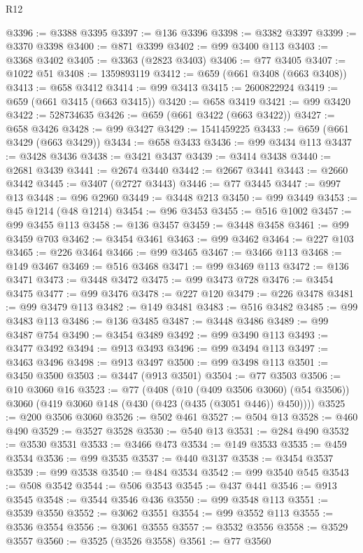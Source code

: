 \begin{lexlean}{R12}
\begin{coremodule}
@3396 := @3388 @3395
@3397 := @136 @3396
@3398 := @3382 @3397
@3399 := @3370 @3398
@3400 := @871 @3399
@3402 := @99 @3400 @113
@3403 := @3368 @3402
@3405 := @3363 (@2823 @3403)
@3406 := @77 @3405
@3407 := @1022 @51
@3408 := 1359893119
@3412 := @659 (@661 @3408 (@663 @3408))
@3413 := @658 @3412
@3414 := @99 @3413
@3415 := 2600822924
@3419 := @659 (@661 @3415 (@663 @3415))
@3420 := @658 @3419
@3421 := @99 @3420
@3422 := 528734635
@3426 := @659 (@661 @3422 (@663 @3422))
@3427 := @658 @3426
@3428 := @99 @3427
@3429 := 1541459225
@3433 := @659 (@661 @3429 (@663 @3429))
@3434 := @658 @3433
@3436 := @99 @3434 @113
@3437 := @3428 @3436
@3438 := @3421 @3437
@3439 := @3414 @3438
@3440 := @2681 @3439
@3441 := @2674 @3440
@3442 := @2667 @3441
@3443 := @2660 @3442
@3445 := @3407 (@2727 @3443)
@3446 := @77 @3445
@3447 := @997 @13
@3448 := @96 @2960
@3449 := @3448 @213
@3450 := @99 @3449
@3453 := @45 @1214 (@48 @1214)
@3454 := @96 @3453
@3455 := @516 @1002
@3457 := @99 @3455 @113
@3458 := @136 @3457
@3459 := @3448 @3458
@3461 := @99 @3459 @703
@3462 := @3454 @3461
@3463 := @99 @3462
@3464 := @227 @103
@3465 := @226 @3464
@3466 := @99 @3465
@3467 := @3466 @113
@3468 := @149 @3467
@3469 := @516 @3468
@3471 := @99 @3469 @113
@3472 := @136 @3471
@3473 := @3448 @3472
@3475 := @99 @3473 @728
@3476 := @3454 @3475
@3477 := @99 @3476
@3478 := @227 @120
@3479 := @226 @3478
@3481 := @99 @3479 @113
@3482 := @149 @3481
@3483 := @516 @3482
@3485 := @99 @3483 @113
@3486 := @136 @3485
@3487 := @3448 @3486
@3489 := @99 @3487 @754
@3490 := @3454 @3489
@3492 := @99 @3490 @113
@3493 := @3477 @3492
@3494 := @913 @3493
@3496 := @99 @3494 @113
@3497 := @3463 @3496
@3498 := @913 @3497
@3500 := @99 @3498 @113
@3501 := @3450 @3500
@3503 := @3447 (@913 @3501)
@3504 := @77 @3503
@3506 := @10 @3060 @16
@3523 := @77
    (@408
      (@10 (@409 @3506 @3060) (@54 @3506))
      @3060
      (@419 @3060 @148 (@430 (@423 (@435 (@3051 @446)) @450))))
@3525 := @200 @3506 @3060
@3526 := @502 @461
@3527 := @504 @13
@3528 := @460 @490
@3529 := @3527 @3528
@3530 := @540 @13
@3531 := @284 @490
@3532 := @3530 @3531
@3533 := @3466 @473
@3534 := @149 @3533
@3535 := @459 @3534
@3536 := @99 @3535
@3537 := @440 @3137
@3538 := @3454 @3537
@3539 := @99 @3538
@3540 := @484 @3534
@3542 := @99 @3540 @545
@3543 := @508 @3542
@3544 := @506 @3543
@3545 := @437 @441
@3546 := @913 @3545
@3548 := @3544 @3546 @436
@3550 := @99 @3548 @113
@3551 := @3539 @3550
@3552 := @3062 @3551
@3554 := @99 @3552 @113
@3555 := @3536 @3554
@3556 := @3061 @3555
@3557 := @3532 @3556
@3558 := @3529 @3557
@3560 := @3525 (@3526 @3558)
@3561 := @77 @3560

\end{coremodule}
\end{lexlean}
